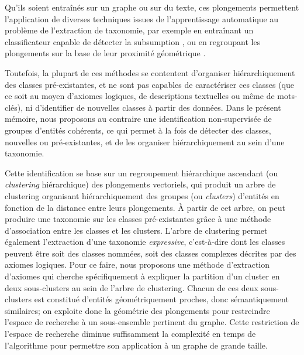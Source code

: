 
Qu'ils soient entraînés sur un graphe ou sur du texte, ces plongements permettent l'application de diverses techniques issues de l'apprentissage automatique au problème de l'extraction de taxonomie, par exemple en entraînant un classificateur capable de détecter la subsumption \cite{fu2014learning}, ou en regroupant les plongements sur la base de leur proximité géométrique \cite{gupta2016domain, zhang2018taxogen}.


Toutefois, la plupart de ces méthodes se contentent d'organiser hiérarchiquement des classes pré-existantes, et ne sont pas capables de caractériser ces classes (que ce soit au moyen d'axiomes logiques, de descriptions textuelles ou même de mots-clés), ni d'identifier de nouvelles classes à partir des données.
%
Dans le présent mémoire, nous proposons au contraire une identification non-supervisée de groupes d'entités cohérents, ce qui permet à la fois de détecter des classes, nouvelles ou pré-existantes, et de les organiser hiérarchiquement au sein d'une taxonomie.

Cette identification se base sur un regroupement hiérarchique ascendant (ou \textit{clustering} hiérarchique) des plongements vectoriels, qui produit un arbre de clustering organisant hiérarchiquement des groupes (ou \textit{clusters}) d'entités en fonction de la distance entre leurs plongements. À partir de cet arbre, on peut produire une taxonomie sur les classes pré-existantes grâce à une méthode d'association entre les classes et les clusters. L'arbre de clustering permet également l'extraction d'une taxonomie \textit{expressive}, c'est-à-dire dont les classes peuvent être soit des classes nommées, soit des classes complexes décrites par des axiomes logiques. Pour ce faire, nous proposons une méthode d'extraction d'axiomes qui cherche spécifiquement à expliquer la partition d'un cluster en deux sous-clusters au sein de l'arbre de clustering. Chacun de ces deux sous-clusters est constitué d'entités géométriquement proches, donc sémantiquement similaires; on exploite donc la géométrie des plongements pour restreindre l'espace de recherche à un sous-ensemble pertinent du graphe. Cette restriction de l'espace de recherche diminue suffisamment la complexité en temps de l'algorithme pour permettre son application à un graphe de grande taille.

